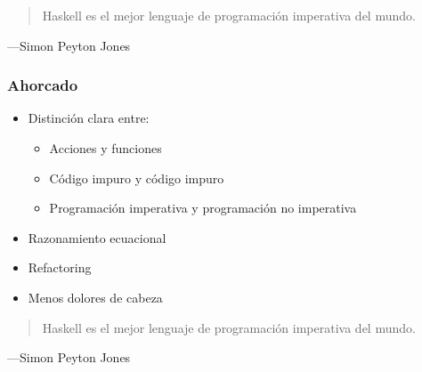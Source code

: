 \documentclass[spanish]{beamer}
\begin{document}

\begin{frame}
  \begin{quote}
    Haskell es el mejor lenguaje de programación imperativa del mundo.
  \end{quote}
  \hfill---Simon Peyton Jones
\end{frame}


\begin{frame}
  \frametitle{Ahorcado}

\end{frame}


\begin{frame}
  \begin{itemize}
  \item
    Distinción clara entre:
    \begin{itemize}
    \item Acciones y funciones
    \item Código impuro y código impuro
    \item Programación imperativa y programación no imperativa
    \end{itemize}
  \item
    Razonamiento ecuacional
  \item
    Refactoring
  \item
    Menos dolores de cabeza
  \end{itemize}
\end{frame}


\begin{frame}
  \begin{quote}
    Haskell es el mejor lenguaje de programación imperativa del mundo.
  \end{quote}
  \hfill---Simon Peyton Jones
\end{frame}

\end{document}

